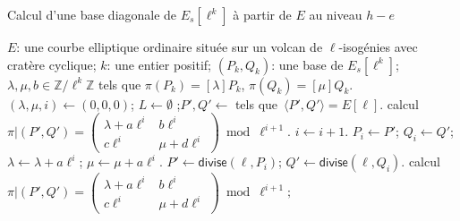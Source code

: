 \documentclass[10pt,a4paper]{book}
\theoremstyle{plain}
\theoremstyle{definition}
\theoremstyle{definition}
\theoremstyle{definition}
\theoremstyle{definition}
\theoremstyle{remark}
\theoremstyle{remark}
\theoremstyle{definition}
\begin{document}
\begin{algorithm}
\caption{\label{alg:ulti:fro}Calcul d'une base diagonale de $E_s[\ell^k]$ à partir de $E$ au niveau $h-e$}
\begin{algorithmic}[1]
\REQUIRE $E$: une courbe elliptique ordinaire située sur un volcan de $\ell$-isogénies avec cratère cyclique;
$k$: une entier positif;
\ENSURE $(P_k, Q_k )$: une base de $E_s[\ell^k]$;
$\lambda, \mu, b \in \mathbb{Z}/\ell^k \mathbb{Z}$
tels que $\pi(P_k)= [\lambda] P_k$, $ \pi(Q_k)= [\mu] Q_k$.
\STATE$(\lambda, \mu, i) \leftarrow (0,0,0)$; $L \leftarrow \emptyset $ ;$P', Q' \leftarrow $ tels que~$\langle P',Q' \rangle =  E[\ell]$. %
\STATE calcul $\pi|(P',Q')=\left( \begin{smallmatrix}
\lambda + a\ell^{i} & b\ell^{i}\\
c\ell^{i} & \mu + d\ell^{i} \end{smallmatrix} \right) \bmod {\ell^{i+1}}.$
 \label{alg:ult:scalaire:debut} %
\STATE $i \leftarrow i+1$. %
\STATE $P_i \leftarrow P'$; $Q_i \leftarrow Q'$; $\lambda \leftarrow \lambda+a \ell^i$; $\mu \leftarrow \mu +a \ell^i$.
\STATE\label{alg:ult:identical:divide}
  $P' \leftarrow \mathsf{divise}(\ell, P_{i})$; $Q' \leftarrow \mathsf{divise} (\ell, Q_{i})$.
\STATE calcul $\pi|(P',Q')=\left( \begin{smallmatrix}
\lambda + a\ell^{i} & b\ell^{i}\\
c\ell^{i} & \mu + d\ell^{i} \end{smallmatrix} \right) \bmod {\ell^{i+1}}; $%
\ENDWHILE \label{alg:ult:scalaire:fin}

\end{algorithmic}
\end{algorithm}
\end{document}
